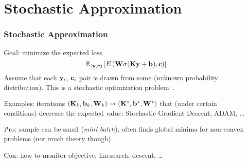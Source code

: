 \documentclass[12pt,fleqn,handout]{beamer}
\begin{document}
\section{Stochastic Approximation}

%
%
%
%


 




\begin{frame}\frametitle{Stochastic Approximation}
	
	Goal: minimize the expected loss
	$$ {\mathbb{E}}_{({\bf y},{\bf c})}\left[E\left({\bf W} \sigma({\bf K}{\bf y}+{\bf b}),{\bf c}\right)\right]$$
	Assume that each ${\bf y}_i$, ${\bf c}_i$ pair is drawn from some (unknown probability distribution). 
	This is a stochastic optimization problem~\cite{bottou2016optimization}. 
	
	\bigskip \pause
	
	Examples: iterations $({\bf K}_k, {\bf b}_k ,{\bf W}_k) \to ({\bf K}^*, {\bf b}^*,{\bf W}^*)$ that (under certain conditions) decrease the expected value: Stochastic Gradient Descent, ADAM, \ldots
		
	\bigskip \pause
	
		Pro: sample can be small (\emph{mini batch}), often finds global minima for non-convex problems (not much theory though)
	
	\smallskip
		
		Con: how to monitor objective, linesearch, descent, \ldots
\end{frame}


%
%
%
%
\end{document}
